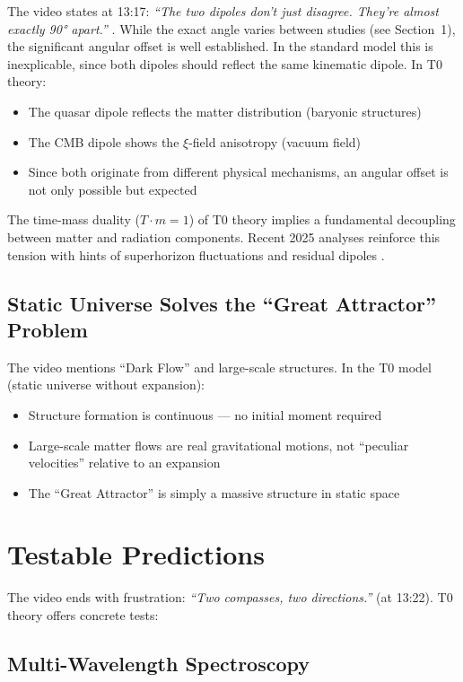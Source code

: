 	The video states at 13:17: \textit{``The two dipoles don't just disagree. They're almost exactly 90° apart.''} \cite{secrest2024}. While the exact angle varies between studies (see Section~1), the significant angular offset is well established. In the standard model this is inexplicable, since both dipoles should reflect the same kinematic dipole. In T0 theory:
	\begin{itemize}
		\item The quasar dipole reflects the matter distribution (baryonic structures)
		\item The CMB dipole shows the $\xi$-field anisotropy (vacuum field)
		\item Since both originate from different physical mechanisms, an angular offset is not only possible but expected
	\end{itemize}

	The time-mass duality ($T \cdot m = 1$) of T0 theory implies a fundamental decoupling between matter and radiation components. Recent 2025 analyses reinforce this tension with hints of superhorizon fluctuations and residual dipoles \cite{sarkar2025, bengaly2025}.

	\subsection{Static Universe Solves the ``Great Attractor'' Problem}

	The video mentions ``Dark Flow'' and large-scale structures. In the T0 model (static universe without expansion):
	\begin{itemize}
		\item Structure formation is continuous --- no initial moment required
		\item Large-scale matter flows are real gravitational motions, not ``peculiar velocities'' relative to an expansion
		\item The ``Great Attractor'' is simply a massive structure in static space
	\end{itemize}

\section{Testable Predictions}

	The video ends with frustration: \textit{``Two compasses, two directions.''} (at 13:22). T0 theory offers concrete tests:

	\subsection{Multi-Wavelength Spectroscopy}


